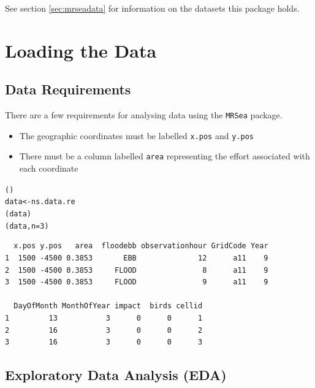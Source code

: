 \noindent See section \ref{sec:mrseadata} for information on the datasets this package holds.

\section{Loading the Data}

\subsection{Data Requirements}
There are a few requirements for analysing data using the {\tt MRSea} package.

\begin{itemize}
\item The geographic coordinates must be labelled {\tt x.pos} and {\tt y.pos}
\item There must be a column labelled {\tt area} representing the effort associated with each coordinate
\end{itemize}

\begin{frame}[fragile]
\begin{knitrout}\footnotesize
{}\color{fgcolor}\begin{kframe}
\begin{alltt}
()
data <- ns.data.re
(data)
(data, n=3)
\end{alltt}
\begin{verbatim}
  x.pos y.pos   area  floodebb observationhour GridCode Year
1  1500 -4500 0.3853       EBB              12      a11    9   
2  1500 -4500 0.3853     FLOOD               8      a11    9    
3  1500 -4500 0.3853     FLOOD               9      a11    9   

  DayOfMonth MonthOfYear impact  birds cellid
1         13           3      0      0      1
2         16           3      0      0      2
3         16           3      0      0      3
\end{verbatim}
\end{kframe}
\end{knitrout}
\end{frame}

\subsection{Exploratory Data Analysis (EDA)}

